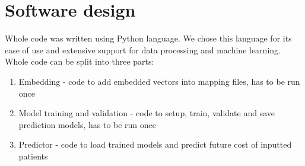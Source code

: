 
\chapter{Software design} \label{chap:softwaredesign}

Whole code was written using Python language. We chose this language for its ease of use and extensive support for data processing and machine learning.
\\

Whole code can be split into three parts:

\begin{enumerate}
	\item Embedding - code to add embedded vectors into mapping files, has to be run once 
	\item Model training and validation - code to setup, train, validate and save prediction models, has to be run once 
	\item Predictor - code to load trained models and predict future cost of inputted patients 
\end{enumerate}